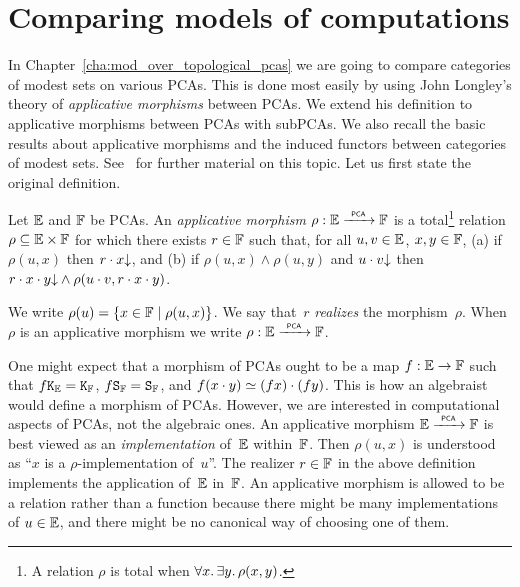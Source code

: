 \section{Comparing models of computations}
\label{sec:comparing-models}%



%
In Chapter~\ref{cha:mod_over_topological_pcas} we are going to compare
categories of modest sets on various PCAs. This is done most easily by
using John Longley's theory of \emph{applicative morphisms} between
PCAs. We extend his definition to applicative morphisms between PCAs
with subPCAs. We also recall the basic results about applicative
morphisms and the induced functors between categories of modest sets.
See~\cite[Chapter 2]{Longley:94} for further material on this topic.
Let us first state the original definition.

\begin{definition}
  \label{def:longley_applicative_morphism}%
  \cite[Definition 2.1.1]{Longley:94}
  Let ${\mathbb{E}}$ and ${\mathbb{F}}$ be PCAs.  An \emph{applicative morphism}
  $\rho: {\mathbb{E}} \xrightarrow{\scriptscriptstyle\mathsf{\ PCA\ }}{} {\mathbb{F}}$ is a total\footnote{A relation $\rho$ is
    total when $\forall x .\, \exists y .\, \rho(x,y)$.} relation $\rho
  \subseteq {\mathbb{E}} \times {\mathbb{F}}$ for which there exists $r \in {\mathbb{F}}$ such
  that, for all $u, v \in {\mathbb{E}}$, $x, y \in {\mathbb{F}}$,
  (a) if $\rho(u, x)$ then $r \cdot x{\downarrow}$, and
  (b) if $\rho(u, x) \land \rho(u, y)$ and $u \cdot v{\downarrow}$ then
  $r \cdot x \cdot y{\downarrow} \land \rho(u \cdot v, r \cdot x \cdot
  y)$.

  We write $\rho(u) = \{x \in {\mathbb{F}} \mid \rho(u, x)\}$.
  We say that~$r$ \emph{realizes} the morphism~$\rho$. When $\rho$ is
  an applicative morphism we write $\rho: {\mathbb{E}} \xrightarrow{\scriptscriptstyle\mathsf{\ PCA\ }}{} {\mathbb{F}}$.
\end{definition}

One might expect that a morphism of PCAs ought to be a map $f: {\mathbb{E}}
\to {\mathbb{F}}$ such that $f \mathtt{K}_{\mathbb{E}} = \mathtt{K}_{\mathbb{F}}$, $f \mathtt{S}_{\mathbb{F}} =
\mathtt{S}_{\mathbb{F}}$, and $f (x \cdot y) \simeq (f x) \cdot (f y)$. This is how
an algebraist would define a morphism of PCAs. However, we are
interested in computational aspects of PCAs, not the algebraic ones.
%
An applicative morphism ${\mathbb{E}} \xrightarrow{\scriptscriptstyle\mathsf{\ PCA\ }}{} {\mathbb{F}}$ is best viewed as an
\emph{implementation} of~${\mathbb{E}}$ within~${\mathbb{F}}$. Then $\rho(u, x)$ is
understood as ``$x$ is a $\rho$-implementation of~$u$''. The realizer
$r \in {\mathbb{F}}$ in the above definition implements the application
of~${\mathbb{E}}$ in~${\mathbb{F}}$. An applicative morphism is allowed to be a
relation rather than a function because there might be many
implementations of $u \in {\mathbb{E}}$, and there might be no canonical way of
choosing one of them.

